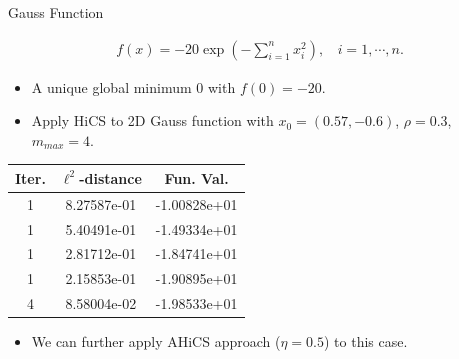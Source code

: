 \documentclass{beamer}
\newcommand{\bmx}{x}
\begin{document}
\begin{frame}{Gauss Function}
\footnotesize{
\begin{align*}
	f(\bmx) = -20 \exp\left( -\sum_{i=1}^n x_i^2 \right),
	~~ ~~i=1,\cdots,n.
\end{align*}
\begin{itemize}
	\item A unique global minimum $0$ with $f(0)=-20$.
\end{itemize}
}
\pause
\footnotesize{
	\begin{itemize}
		\item Apply HiCS to 2D Gauss function with $x_0 = (0.57, -0.6)$,
			$\rho=0.3$, $m_{max}=4$.
\end{itemize}
}
\vspace{-0.2cm}
\begin{table}[!htbp]
\begin{center}
\footnotesize{
\begin{tabular}{|c|c|c|}
 \hline
    Iter. & $\ell^2$-distance &  Fun. Val.
 \\\hline
  1 & 8.27587e-01 & -1.00828e+01
 \\ \hline                                                                                                                                       
  1 & 5.40491e-01 & -1.49334e+01
  \\ \hline  
  1 & 2.81712e-01 & -1.84741e+01  
    \\ \hline  
  1 & 2.15853e-01 & -1.90895e+01  
    \\ \hline  
  4 & 8.58004e-02 & -1.98533e+01  
 \\\hline
\end{tabular}
}
\end{center}
\end{table}
\vspace{-0.3cm}
\pause
\footnotesize{
	\begin{itemize}
		\item We can further apply AHiCS approach ($\eta=0.5$) to this case.
	\end{itemize}
\vspace{-0.1cm}
}
\end{frame}
\end{document}
